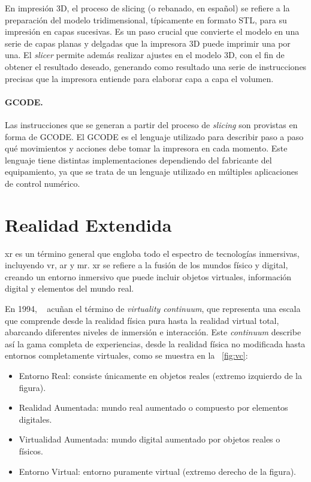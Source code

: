 En impresión 3D, el proceso de slicing (o rebanado, en español) se refiere a la preparación del modelo tridimensional, típicamente en formato STL, para su impresión en capas sucesivas. Es un paso crucial que convierte el modelo en una serie de capas planas y delgadas que la impresora 3D puede imprimir una por una.
El \emph{slicer} permite además realizar ajustes en el modelo 3D, con el fin de obtener el resultado deseado, generando como resultado una serie de instrucciones precisas que la impresora entiende para elaborar capa a capa el volumen.

\paragraph{GCODE.} Las instrucciones que se generan a partir del proceso de \emph{slicing} son provistas en forma de GCODE. El GCODE es el lenguaje utilizado para describir paso a paso qué movimientos y acciones debe tomar la impresora en cada momento. Este lenguaje tiene distintas implementaciones dependiendo del fabricante del equipamiento, ya que se trata de un lenguaje utilizado en múltiples aplicaciones de control numérico.

\section{Realidad Extendida}

\acrfull{xr} es un término general que engloba todo el espectro de tecnologías inmersivas, incluyendo \acrfull{vr}, \acrfull{ar} y \acrfull{mr}. \acrshort{xr} se refiere a la fusión de los mundos físico y digital, creando un entorno inmersivo que puede incluir objetos virtuales, información digital y elementos del mundo real.

En 1994, \citeauthor{Milgram1994ATO}~\cite{Milgram1994ATO} acuñan el término de \emph{virtuality continuum}, que representa una escala que comprende desde la realidad física pura hasta la realidad virtual total, abarcando diferentes niveles de inmersión e interacción. Este \emph{continuum} describe así la gama completa de experiencias, desde la realidad física no modificada hasta entornos completamente virtuales, como se muestra en la \figurename~\ref{fig:vc}:
\begin{itemize}
	\item Entorno Real: consiste únicamente en objetos reales (extremo izquierdo de la figura).
	\item Realidad Aumentada: mundo real aumentado o compuesto por elementos digitales.
	\item Virtualidad Aumentada: mundo digital aumentado por objetos reales o físicos.
	\item Entorno Virtual: entorno puramente virtual (extremo derecho de la figura).
\end{itemize}

